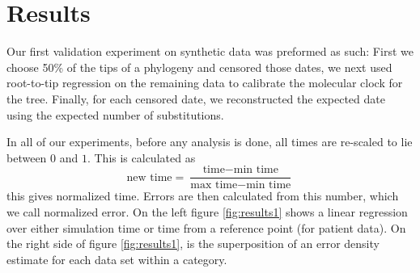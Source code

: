 \section{Results} \label{sec:results}
Our first validation experiment on synthetic data was preformed as such: First we choose 50\% of the tips of a phylogeny and censored those dates, we next used root-to-tip regression \citep{APE} on the remaining data to calibrate the molecular clock for the tree. Finally, for each censored date, we reconstructed the expected date using the expected number of substitutions.

In all of our experiments, before any analysis is done, all times are re-scaled to lie between $0$ and $1$. This is calculated as $$ \text{new time} = \frac{\text{time} - \text{min time}}{\text{max time} - \text{min time}}$$ this gives normalized time. Errors are then calculated from this number, which we call normalized error. On the left figure \ref{fig:results1} shows a linear regression over either simulation time or time from a reference point (for patient data). On the right side of figure \ref{fig:results1}, is the superposition of an error density estimate for each data set within a category. 

